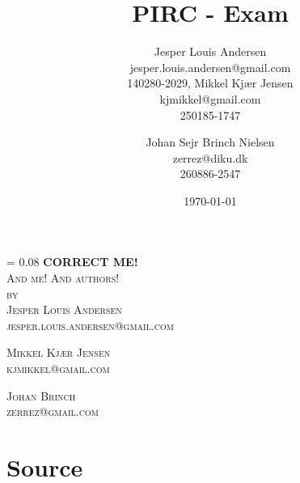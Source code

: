 \documentclass[a4paper, oneside, 10pt, draft]{memoir}
\author{Jesper Louis
  Andersen\\jesper.louis.andersen@gmail.com\\140280-2029,
  Mikkel Kj\ae r Jensen \\ kjmikkel@gmail.com\\250185-1747 \and
  Johan Sejr Brinch Nielsen \\ zerrez@diku.dk \\ 260886-2547
}
\title{PIRC - Exam}
\date{\today}
\makeatletter
\renewcommand*{\titleM}{\begingroup%
  \drop = 0.08\textheight
  \centering
  {\Huge\bfseries CORRECT ME!}\\[\baselineskip]
  {\scshape And me! And authors!}\\[\baselineskip]
  {\scshape by}\\[\baselineskip]
  {\large\scshape Jesper Louis Andersen\\jesper.louis.andersen@gmail.com}\par
  {\large\scshape Mikkel Kj\ae r Jensen\\kjmikkel@gmail.com}\par
  {\large\scshape Johan Brinch\\zerrez@gmail.com}\par
  \endgroup}
\makeatother
\begin{document}
\titleM





%
%
%


\appendix

\clearpage
\section{Source}

\clearpage

\clearpage

\clearpage

\clearpage

\end{document}
